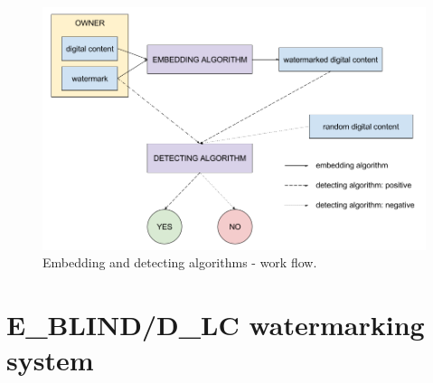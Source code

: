\documentclass[a4paper,12pt]{article}
\begin{document}
\begin{figure}[ht]
  \centering
    \includegraphics[width=1.0\textwidth]{../../images/embedding-detecting-algorithm.png}
  \caption{Embedding and detecting algorithms - work flow.}
  \label{fig:background-schema}
\end{figure}

\section{E\_BLIND/D\_LC watermarking system}
\end{document}
